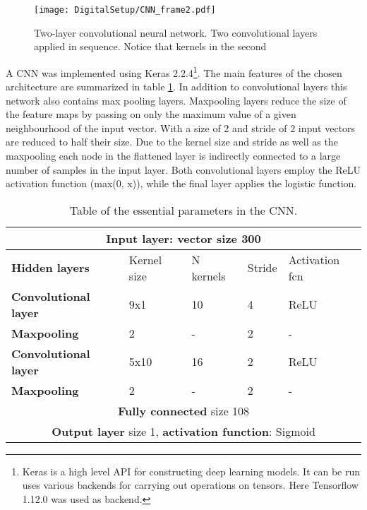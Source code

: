 \documentclass[main.tex]{subfiles}
\begin{document}
\begin{figure}[ht!]
    \centering
        \texttt{[image: DigitalSetup/CNN\_frame2.pdf]}
        \caption[Two-layer convolutional neural network.]{Two-layer convolutional neural network. Two convolutional layers applied in sequence. Notice that kernels in the second }
    \label{fig:CNN_frame2} 
\end{figure}

A CNN was implemented using Keras 2.2.4\footnote{Keras is a high level API for constructing deep learning models. It can be run uses various backends for carrying out operations on tensors. Here Tensorflow 1.12.0 was used as backend.}\cite{keras}. The main features of the chosen architecture are summarized in table \ref{tab:architecture}. In addition to convolutional layers this network also contains max pooling layers. Maxpooling layers reduce the size of the feature maps by passing on only the maximum value of a given neighbourhood of the input vector. With a size of 2 and stride of 2 input vectors are reduced to half their size. Due to the kernel size and stride as well as the maxpooling each node in the flattened layer is indirectly connected to a large number of samples in the input layer. Both convolutional layers employ the ReLU activation function (max(0, x)), while the final layer applies the logistic function.
\begin{table}[h]
\center
\begin{tabular}{|l|l|l|l|l|}
\hline
\multicolumn{5}{|c|}{\textbf{Input layer}: vector size 300}                                            \\ \hline
\textbf{Hidden layers}       & Kernel size & N kernels & Stride & Activation fcn \\ \hline
\textbf{Convolutional layer} & 9x1           & 10                & 4             & ReLU                \\ \hline
\textbf{Maxpooling}          & 2           & -                 & 2             & -                   \\ \hline
\textbf{Convolutional layer} & 5x10           & 16                & 2             & ReLU                \\ \hline
\textbf{Maxpooling}          & 2           & -                 & 2             & -                   \\ \hline
\multicolumn{5}{|c|}{\textbf{Fully connected} size 108}
\\ \hline
\multicolumn{5}{|c|}{\textbf{Output layer} size 1, \textbf{activation function}: Sigmoid}               \\ \hline
\end{tabular}
\caption{Table of the essential parameters in the CNN.}
\label{tab:architecture}
\end{table}
\end{document}
